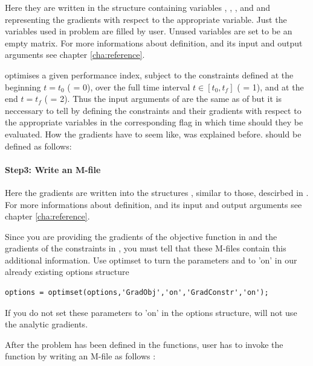{\small }

Here they are written in the structure  containing
variables , , , and  and
representing the gradients with respect to the appropriate
variable. Just the variables used in problem are filled by
user. Unused variables are set to be an empty matrix. For more
informations about  definition, and its input and output
arguments see chapter \ref{cha:reference}. 

 optimises a given performance index, subject to the
constraints defined at the beginning $t =
t_{0}$ ( = 0), over the full time interval $t \in
[t_{0},t_{f}]$ ( = 1), and at the end $t = t_{f}$
( = 2). Thus the input arguments of  are the
same as of  but it is neccessary to tell  by
defining the constraints and their gradients with respect to the
appropriate variables in the corresponding flag in which time should
they be evaluated. How the gradients have to seem like, was explained
before.  should be defined as follows:  
 
\paragraph{Step3: Write an M-file~}

{\small }

Here the gradients are written into the structures ,
 similar to those, descirbed in . For more
informations about  definition, and its input and output
arguments see chapter \ref{cha:reference}.

Since you are providing the gradients of the objective function in
 and the gradients of the constraints in
, you must tell  that these M-files
contain this additional information. Use optimset to turn the
parameters  and  to 'on' in our
already existing options structure 
\begin{verbatim}
options = optimset(options,'GradObj','on','GradConstr','on');
\end{verbatim}
If you do not set these parameters to 'on' in the options structure,
 will not use the analytic gradients.  

After the problem has been defined in the functions, user has to invoke
the  function by writing an M-file  as
follows :

